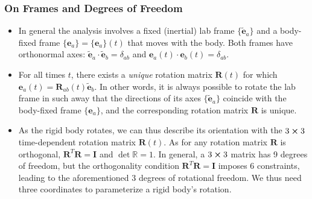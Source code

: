 \documentclass[11pt, a4paper]{article}
\newcommand{\R}{\mathbb{R}} %
\newcommand{\e}{\mathbf{e}} %
\newcommand{\mat}[1]{\mathbf{#1}} %
\begin{document}
\subsubsection{On Frames and Degrees of Freedom}
\begin{itemize}
	\item In general the analysis involves a fixed (inertial) lab frame $ \{\tilde{\e}_{a} \} $ and a body-fixed frame $ \{\e_{a} \} = \{\e_{a} \}(t)$ that moves with the body. Both frames have orthonormal axes: $ \tilde{\e}_{a} \cdot \tilde{\e}_{b} = \delta_{ab} $ and $ \e_{a}(t) \cdot \e_{b}(t) = \delta_{ab} $.
	
	\item For all times $ t $, there exists a \textit{unique} rotation matrix $ \mathbf{R}(t) $ for which $ \e_{a}(t) = \mat{R}_{ab}(t) \tilde{\e}_{b} $. In other words, it is always possible to rotate the lab frame in such away that the directions of its axes $ \{\tilde{\e}_{a} \} $ coincide with the body-fixed frame $ \{\e_{a}\} $, and the corresponding rotation matrix $ \mat{R} $ is unique.
	
	\item As the rigid body rotates, we can thus describe its orientation with the $ 3 \cross 3 $ time-dependent rotation matrix $ \mathbf{R}(t) $. As for any rotation matrix $ \mat{R} $ is orthogonal, $ \mathbf{R}^{T} \mathbf{R} = \mathbf{I} $ and $ \det \R  = 1$. In general, a $ 3 \cross 3 $ matrix has 9 degrees of freedom, but the orthogonality condition $ \mathbf{R}^{T} \mathbf{R} = \mathbf{I} $ imposes 6 constraints, leading to the aforementioned 3 degrees of rotational freedom. We thus need three coordinates to parameterize a rigid body's rotation.

\end{itemize}
\end{document}
